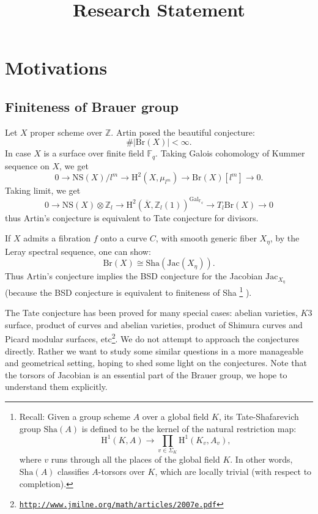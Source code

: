 \documentclass[8pt]{amsart}
\begin{document}
\title{Research Statement}

\maketitle

\tableofcontents
%
\section{Motivations}
\subsection{Finiteness of Brauer group}
Let $X$ proper scheme over $\mathbb{Z}$. Artin posed the beautiful conjecture: $$\#|\mathrm{Br}(X)|<\infty.$$
In case $X$ is a surface over finite field $\mathbb{F}_q$. Taking Galois cohomology of Kummer sequence on $X$, we get
$$0\to\mathrm{NS}(X)/l^m\to\mathrm{H}^2(X,\mu_{l^m})\to\mathrm{Br}(X)[l^m]\to 0.$$ Taking limit, we get $$0\to\mathrm{NS}(X)\otimes\mathbb{Z}_l\to\mathrm{H}^2(\overline{X},\mathbb{Z}_l(1))^{\mathrm{Gal}_{\mathbb{F}_q}}\to T_l\mathrm{Br}(X)\to 0$$ thus Artin's conjecture is equivalent to Tate conjecture for divisors.

If $X$ admits a fibration $f$ onto a curve $C$, with smooth generic fiber $X_\eta$, by the Leray spectral sequence, one can show: $$\mathrm{Br}(X)\cong\mathrm{Sha}(\mathrm{Jac}(X_\eta)).$$ Thus Artin's conjecture implies the BSD conjecture for the Jacobian $\mathrm{Jac}_{X_\eta}$ (because the BSD conjecture is equivalent to finiteness of Sha {\footnote{\label{explainsha}Recall: Given a group scheme $A$ over a global field $K$, its Tate-Shafarevich group $\mathrm{Sha}(A)$ is defined to be the kernel of the natural restriction map: $$\mathrm{H}^1(K,A)\to\prod_{v\in\Sigma_K}\mathrm{H}^1(K_v,A_v),$$
where $v$ runs through all the places of the global field $K$. In other words, $\mathrm{Sha}(A)$ classifies $A$-torsors over $K$, which are locally trivial (with respect to completion).}}
).

The Tate conjecture has been proved for many special cases: abelian varieties, $K3$ surface, product of curves and abelian varieties, product of Shimura curves and Picard modular surfaces, etc\footnote{\href{http://www.jmilne.org/math/articles/2007e.pdf}{\texttt{http://www.jmilne.org/math/articles/2007e.pdf}}}. We do not attempt to approach the conjectures directly. Rather we want to study some similar questions in a more manageable and geometrical setting, hoping to shed some light on the conjectures. Note that the torsors of Jacobian is an essential part of the Brauer group, we hope to understand them explicitly.
\end{document}
